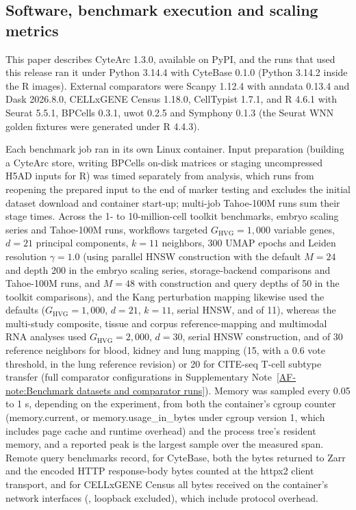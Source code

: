 \documentclass[11pt]{article}
\newcommand{\sref}[1]{\ref*{AF-#1}}
\begin{document}
\subsection*{Software, benchmark execution and scaling metrics}\label{sec:Software and execution}

This paper describes CyteArc 1.3.0, available on PyPI, and the runs that used this release ran it under Python 3.14.4 with CyteBase 0.1.0 (Python 3.14.2 inside the R images). External comparators were Scanpy 1.12.4 with anndata 0.13.4 and Dask 2026.8.0, CELLxGENE Census 1.18.0, CellTypist 1.7.1, and R 4.6.1 with Seurat 5.5.1, BPCells 0.3.1, uwot 0.2.5 and Symphony 0.1.3 (the Seurat WNN golden fixtures were generated under R 4.4.3).

Each benchmark job ran in its own Linux container. Input preparation (building a CyteArc store, writing BPCells on-disk matrices or staging uncompressed H5AD inputs for R) was timed separately from analysis, which runs from reopening the prepared input to the end of marker testing and excludes the initial dataset download and container start-up; multi-job Tahoe-100M runs sum their stage times. Across the 1- to 10-million-cell toolkit benchmarks, embryo scaling series and Tahoe-100M runs, workflows targeted $G_{\mathrm{HVG}}=1{,}000$ variable genes, $d=21$ principal components, $k=11$ neighbors, 300 UMAP epochs and Leiden resolution $\gamma=1.0$ (using parallel HNSW construction with the default $M=24$ and depth 200 in the embryo scaling series, storage-backend comparisons and Tahoe-100M runs, and $M=48$ with construction and query depths of 50 in the toolkit comparisons), and the Kang perturbation mapping likewise used the defaults ($G_{\mathrm{HVG}}=1{,}000$, $d=21$, $k=11$, serial HNSW, and  of 11), whereas the multi-study composite, tissue and corpus reference-mapping and multimodal RNA analyses used $G_{\mathrm{HVG}}=2{,}000$, $d=30$, serial HNSW construction, and  of 30 reference neighbors for blood, kidney and lung mapping (15, with a 0.6 vote threshold, in the lung reference revision) or 20 for CITE-seq T-cell subtype transfer (full comparator configurations in Supplementary Note~\sref{note:Benchmark datasets and comparator runs}). Memory was sampled every 0.05 to 1 s, depending on the experiment, from both the container's cgroup counter (memory.current, or memory.usage\_in\_bytes under cgroup version 1, which includes page cache and runtime overhead) and the process tree's resident memory, and a reported peak is the largest sample over the measured span. Remote query benchmarks record, for CyteBase, both the bytes returned to Zarr and the encoded HTTP response-body bytes counted at the httpx2 client transport, and for CELLxGENE Census all bytes received on the container's network interfaces (, loopback excluded), which include protocol overhead.
\end{document}
